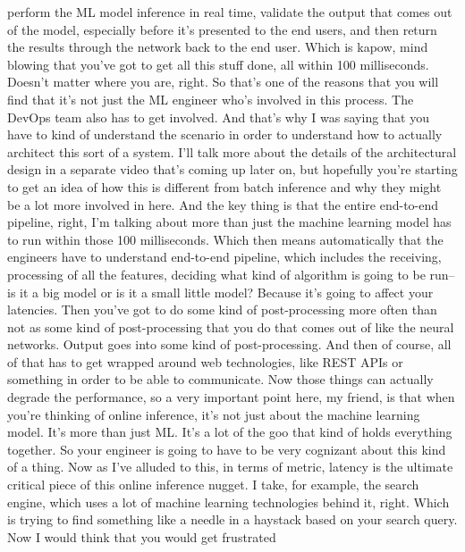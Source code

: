 {{{{{{{    perform the ML model inference in real time,
    validate the output that comes out of the model,
    especially before it's presented to the end users,
    and then return the results through the network back to the end user.
    Which is kapow, mind blowing that you've got to get all this stuff done,
    all within 100 milliseconds.
    Doesn't matter where you are, right.
    So that's one of the reasons that you will
    find that it's not just the ML engineer who's involved in this process.
    The DevOps team also has to get involved.
    And that's why I was saying that you have to kind of understand
    the scenario in order to understand how to actually architect
    this sort of a system.
    I'll talk more about the details of the architectural design
    in a separate video that's coming up later on,
    but hopefully you're starting to get an idea
    of how this is different from batch inference
    and why they might be a lot more involved in here.
    And the key thing is that the entire end-to-end pipeline, right,
    I'm talking about more than just the machine learning model
    has to run within those 100 milliseconds.
    Which then means automatically that the engineers have to understand end-to-end
    pipeline, which includes the receiving, processing of all the features,
    deciding what kind of algorithm is going to be run--
    is it a big model or is it a small little model?
    Because it's going to affect your latencies.
    Then you've got to do some kind of post-processing more often than not as
    some kind of post-processing that you do that comes out
    of like the neural networks.
    Output goes into some kind of post-processing.
    And then of course, all of that has to get wrapped around web technologies,
    like REST APIs or something in order to be able to communicate.
    Now those things can actually degrade the performance,
    so a very important point here, my friend,
    is that when you're thinking of online inference,
    it's not just about the machine learning model.
    It's more than just ML.
    It's a lot of the goo that kind of holds everything together.
    So your engineer is going to have to be very
    cognizant about this kind of a thing.
    Now as I've alluded to this, in terms of metric,
    latency is the ultimate critical piece of this online inference nugget.
    I take, for example, the search engine, which
    uses a lot of machine learning technologies behind it, right.
    Which is trying to find something like a needle in a haystack
    based on your search query.
    Now I would think that you would get frustrated
}}}}}}}
